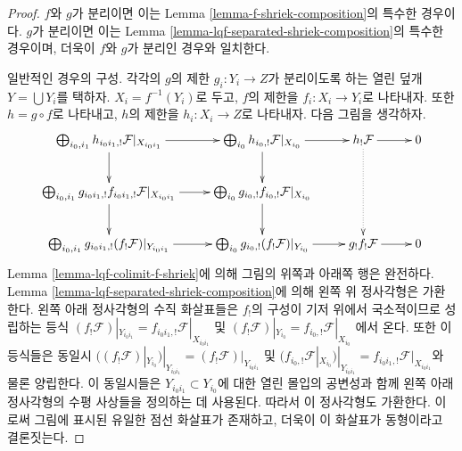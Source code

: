 \begin{proof}
$f$와 $g$가 분리이면 이는 Lemma
\ref{lemma-f-shriek-composition}의 특수한 경우이다. $g$가 분리이면
이는 Lemma \ref{lemma-lqf-separated-shriek-composition}의 특수한
경우이며, 더욱이 $f$와 $g$가 분리인 경우와 일치한다.

\medskip\noindent
일반적인 경우의 구성. 각각의 $g$의 제한
$g_i : Y_i \to Z$가 분리이도록 하는 열린 덮개
$Y = \bigcup Y_i$를 택하자. $X_i = f^{-1}(Y_i)$로 두고,
$f$의 제한을 $f_i : X_i \to Y_i$로 나타내자. 또한
$h = g \circ f$로 나타내고, $h$의 제한을 $h_i : X_i \to Z$로
나타내자. 다음 그림을 생각하자.
$$
\xymatrix{
\bigoplus\nolimits_{i_0, i_1}
h_{i_0i_1, !}\mathcal{F}|_{X_{i_0i_1}} \ar[r] \ar[d] &
\bigoplus\nolimits_{i_0} h_{i_0, !}\mathcal{F}|_{X_{i_0}} \ar[r] \ar[d] &
h_!\mathcal{F} \ar[r] \ar@{..>}[dd] &
0 \\
\bigoplus\nolimits_{i_0, i_1}
g_{i_0i_1, !} f_{i_0i_1, !}\mathcal{F}|_{X_{i_0i_1}} \ar[r] \ar[d] &
\bigoplus\nolimits_{i_0}
g_{i_0, !} f_{i_0, !}\mathcal{F}|_{X_{i_0}} \ar[d] \\
\bigoplus\nolimits_{i_0, i_1}
g_{i_0i_1, !} (f_!\mathcal{F})|_{Y_{i_0i_1}} \ar[r] &
\bigoplus\nolimits_{i_0}
g_{i_0, !} (f_!\mathcal{F})|_{Y_{i_0}} \ar[r] &
g_!f_!\mathcal{F} \ar[r] &
0
}
$$
Lemma \ref{lemma-lqf-colimit-f-shriek}에 의해 그림의 위쪽과 아래쪽
행은 완전하다. Lemma
\ref{lemma-lqf-separated-shriek-composition}에 의해 왼쪽 위
정사각형은 가환한다. 왼쪽 아래 정사각형의 수직 화살표들은
$f_!$의 구성이 기저 위에서 국소적이므로 성립하는 등식
$(f_!\mathcal{F})|_{Y_{i_0i_1}} =
f_{i_0i_1, !}\mathcal{F}|_{X_{i_0i_1}}$ 및
$(f_!\mathcal{F})|_{Y_{i_0}} = f_{i_0, !}\mathcal{F}|_{X_{i_0}}$
에서 온다. 또한 이 등식들은 동일시
$((f_!\mathcal{F})|_{Y_{i_0}})|_{Y_{i_0i_1}} =
(f_!\mathcal{F})|_{Y_{i_0i_1}}$ 및
$(f_{i_0, !}\mathcal{F}|_{X_{i_0}})|_{Y_{i_0i_1}} =
f_{i_0i_1, !}\mathcal{F}|_{X_{i_0i_1}}$와 물론 양립한다.
이 동일시들은 $Y_{i_0i_1} \subset Y_{i_0}$에 대한 열린 몰입의
공변성과 함께 왼쪽 아래 정사각형의 수평 사상들을 정의하는 데
사용된다. 따라서 이 정사각형도 가환한다. 이로써 그림에 표시된
유일한 점선 화살표가 존재하고, 더욱이 이 화살표가 동형이라고
결론짓는다.


\end{proof}

